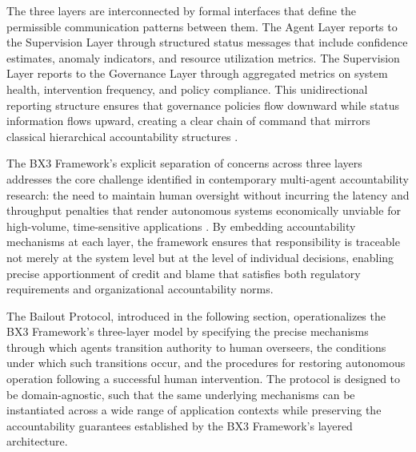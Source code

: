 The three layers are interconnected by formal interfaces that define the permissible communication patterns between them. The Agent Layer reports to the Supervision Layer through structured status messages that include confidence estimates, anomaly indicators, and resource utilization metrics. The Supervision Layer reports to the Governance Layer through aggregated metrics on system health, intervention frequency, and policy compliance. This unidirectional reporting structure ensures that governance policies flow downward while status information flows upward, creating a clear chain of command that mirrors classical hierarchical accountability structures \cite{wiener1948}.

The BX3 Framework's explicit separation of concerns across three layers addresses the core challenge identified in contemporary multi-agent accountability research: the need to maintain human oversight without incurring the latency and throughput penalties that render autonomous systems economically unviable for high-volume, time-sensitive applications \cite{tristr81}. By embedding accountability mechanisms at each layer, the framework ensures that responsibility is traceable not merely at the system level but at the level of individual decisions, enabling precise apportionment of credit and blame that satisfies both regulatory requirements and organizational accountability norms.

The Bailout Protocol, introduced in the following section, operationalizes the BX3 Framework's three-layer model by specifying the precise mechanisms through which agents transition authority to human overseers, the conditions under which such transitions occur, and the procedures for restoring autonomous operation following a successful human intervention. The protocol is designed to be domain-agnostic, such that the same underlying mechanisms can be instantiated across a wide range of application contexts while preserving the accountability guarantees established by the BX3 Framework's layered architecture.
